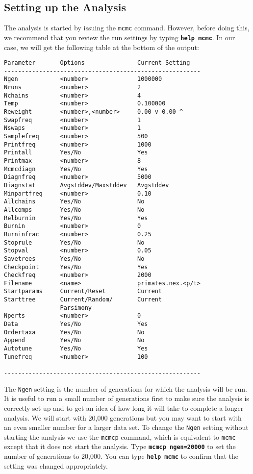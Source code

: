 \documentclass[12pt]{book}
\newcommand{\ttt}[1]{\texttt{#1}}
\newcommand{\tb}[1]{\ttt{\textbf{#1}}}
\begin{document}
\subsection{Setting up the Analysis}

The analysis is started by issuing the \texttt{mcmc} command. However, before doing this, we
recommend that you review the run settings by typing \tb{help mcmc}. In our case, we will get the
following table at the bottom of the output:

\begin{Verbatim}[xleftmargin=15mm,fontsize=\footnotesize]
Parameter       Options               Current Setting
--------------------------------------------------------
Ngen            <number>              1000000
Nruns           <number>              2
Nchains         <number>              4
Temp            <number>              0.100000
Reweight        <number>,<number>     0.00 v 0.00 ^
Swapfreq        <number>              1
Nswaps          <number>              1
Samplefreq      <number>              500
Printfreq       <number>              1000
Printall        Yes/No                Yes
Printmax        <number>              8
Mcmcdiagn       Yes/No                Yes
Diagnfreq       <number>              5000
Diagnstat       Avgstddev/Maxstddev   Avgstddev
Minpartfreq     <number>              0.10
Allchains       Yes/No                No
Allcomps        Yes/No                No
Relburnin       Yes/No                Yes
Burnin          <number>              0
Burninfrac      <number>              0.25
Stoprule        Yes/No                No
Stopval         <number>              0.05
Savetrees       Yes/No                No
Checkpoint      Yes/No                Yes
Checkfreq       <number>              2000
Filename        <name>                primates.nex.<p/t>
Startparams     Current/Reset         Current
Starttree       Current/Random/       Current
                Parsimony
Nperts          <number>              0
Data            Yes/No                Yes
Ordertaxa       Yes/No                No
Append          Yes/No                No
Autotune        Yes/No                Yes
Tunefreq        <number>              100

--------------------------------------------------------
\end{Verbatim}

The \texttt{Ngen} setting is the number of generations for which the analysis will be run. It is
useful to run a small number of generations first to make sure the analysis is correctly set up and
to get an idea of how long it will take to complete a longer analysis. We will start with 20,000
generations but you may want to start with an even smaller number for a larger data set. To change
the \texttt{Ngen} setting without starting the analysis we use the \texttt{mcmcp} command, which is
equivalent to \texttt{mcmc} except that it does not start the analysis. Type \tb{mcmcp ngen=20000}
to set the number of generations to 20,000. You can type \tb{help mcmc} to confirm that the setting
was changed appropriately.
\end{document}
